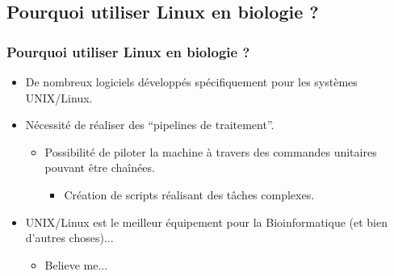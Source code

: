 \documentclass[10pt, xcolor=dvipsnames]{beamer}
\begin{document}
\subsection{Pourquoi utiliser Linux en biologie ?}
\frame
    {
      \frametitle{Pourquoi utiliser Linux en biologie ?}
      \begin{itemize}                   

      \item De nombreux logiciels développés spécifiquement pour les systèmes UNIX/Linux.
	  \item Nécessité de réaliser des ``pipelines de traitement''.
		\begin{itemize}
	    \item Possibilité de piloter la machine à travers des commandes unitaires pouvant être chaînées.        
          \begin{itemize}                   
          \item Création de scripts réalisant des tâches complexes.
          \end{itemize}
		\end{itemize}
      \item UNIX/Linux est le meilleur équipement pour la Bioinformatique (et bien d'autres choses)...

        \begin{itemize}                   
        \item Believe me...
        \end{itemize}
      \end{itemize}


    }

 
\end{document}

